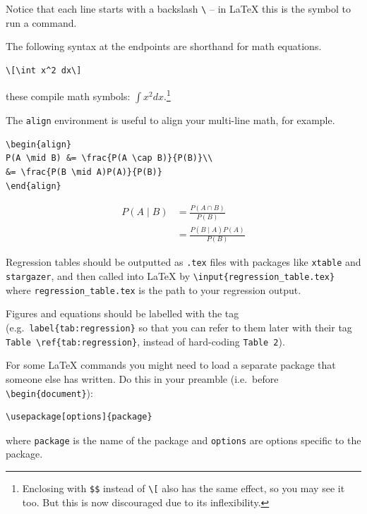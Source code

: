 \documentclass[
  letterpaper,
]{book}
\theoremstyle{definition}
\theoremstyle{definition}
\theoremstyle{plain}
\theoremstyle{definition}
\theoremstyle{plain}
\theoremstyle{plain}
\theoremstyle{remark}
\begin{document}
Notice that each line starts with a backslash \texttt{\textbackslash{}}
-- in LaTeX this is the symbol to run a command.

The following syntax at the endpoints are shorthand for math equations.

\begin{verbatim}
\[\int x^2 dx\]
\end{verbatim}

these compile math symbols: \(\displaystyle \int x^2 dx.\)\footnote{Enclosing
  with \texttt{\$\$} instead of \texttt{\textbackslash{}{[}} also has
  the same effect, so you may see it too. But this is now discouraged
  due to its inflexibility.}

The \texttt{align} environment is useful to align your multi-line math,
for example.

\begin{verbatim}
\begin{align}
P(A \mid B) &= \frac{P(A \cap B)}{P(B)}\\
&= \frac{P(B \mid A)P(A)}{P(B)}
\end{align}
\end{verbatim}

\begin{align}
P(A \mid B) &= \frac{P(A \cap B)}{P(B)}\\
&= \frac{P(B \mid A)P(A)}{P(B)}
\end{align}

Regression tables should be outputted as \texttt{.tex} files with
packages like \texttt{xtable} and \texttt{stargazer}, and then called
into LaTeX by \texttt{\textbackslash{}input\{regression\_table.tex\}}
where \texttt{regression\_table.tex} is the path to your regression
output.

Figures and equations should be labelled with the tag
(e.g.~\texttt{label\{tab:regression\}} so that you can refer to them
later with their tag
\texttt{Table\ \textbackslash{}ref\{tab:regression\}}, instead of
hard-coding \texttt{Table\ 2}).

For some LaTeX commands you might need to load a separate package that
someone else has written. Do this in your preamble (i.e.~before
\texttt{\textbackslash{}begin\{document\}}):

\begin{verbatim}
\usepackage[options]{package}
\end{verbatim}

where \texttt{package} is the name of the package and \texttt{options}
are options specific to the package.
\end{document}
